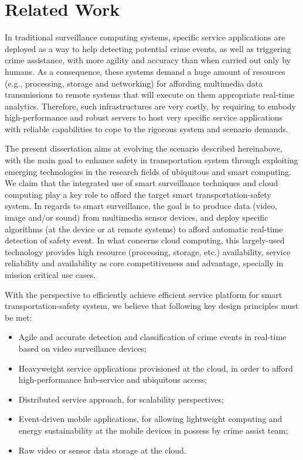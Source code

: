 \chapter{Related Work}

In traditional surveillance computing systems, specific service applications are deployed as a way to help detecting potential crime events, as well as triggering crime assistance, with more agility and accuracy than when carried out only by humans. As a consequence, these systems demand a huge amount of resources (e.g., processing, storage and networking) for affording multimedia data transmissions to remote systems that will execute on them appropriate real-time analytics. Therefore, such infrastructures are very costly, by requiring to embody high-performance and robust servers to host very specific service applications with reliable capabilities to cope to the rigorous system and scenario demands. 

The present dissertation aims at evolving the scenario described hereinabove, with the main goal to enhance safety in transportation system through exploiting emerging technologies in the research fields of ubiquitous and smart computing. We claim that the integrated use of smart surveillance techniques and cloud computing play a key role to afford the target smart transportation-safety system. In regards to smart surveillance, the goal is to produce data (video, image and/or sound) from multimedia sensor devices, and deploy specific algorithms (at the device or at remote systems) to afford automatic real-time detection of safety event. In what concerns cloud computing, this largely-used technology provides high resource (processing, storage, etc.) availability, service reliability and availability as core competitiveness and advantage, specially in mission critical use cases. 

With the perspective to efficiently achieve efficient service platform for smart transportation-safety system, we believe that following key design principles must be met:

\begin{itemize}
\item Agile and accurate detection and classification of crime events in real-time based on video surveillance devices;
\item Heavyweight service applications provisioned at the cloud, in order to afford high-performance hub-service and ubiquitous access;
\item Distributed service approach, for scalability perspectives;
\item Event-driven mobile applications, for allowing lightweight computing and energy sustainability at the mobile devices in possess by crime assist team; 
\item Raw video or sensor data storage at the cloud.
\end{itemize}

